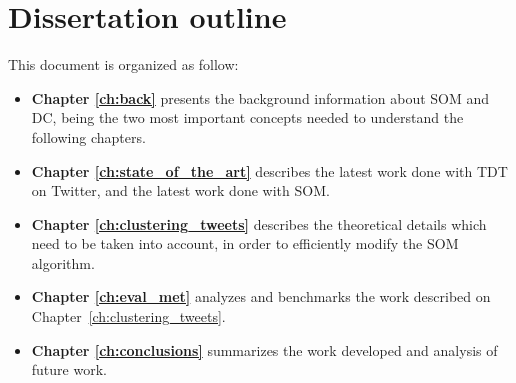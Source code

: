 \section{Dissertation outline}
This document is organized as follow:
\begin{itemize}
  \item \textbf{Chapter \ref{ch:back}} presents the background information about \ac{SOM} and \ac{DC}, being the two most important concepts needed to understand the following chapters.  
  \item \textbf{Chapter \ref{ch:state_of_the_art}} describes the latest work done with \ac{TDT} on Twitter, and the latest work done with \ac{SOM}. 
  \item \textbf{Chapter \ref{ch:clustering_tweets}} describes the theoretical details which need to be taken into account, in order to efficiently modify the \ac{SOM} algorithm.
  \item \textbf{ Chapter \ref{ch:eval_met} } analyzes and benchmarks the work described on Chapter~\ref{ch:clustering_tweets}.
  \item \textbf{ Chapter \ref{ch:conclusions} } summarizes the work developed and analysis of future work.
\end{itemize}

\cleardoublepage 

